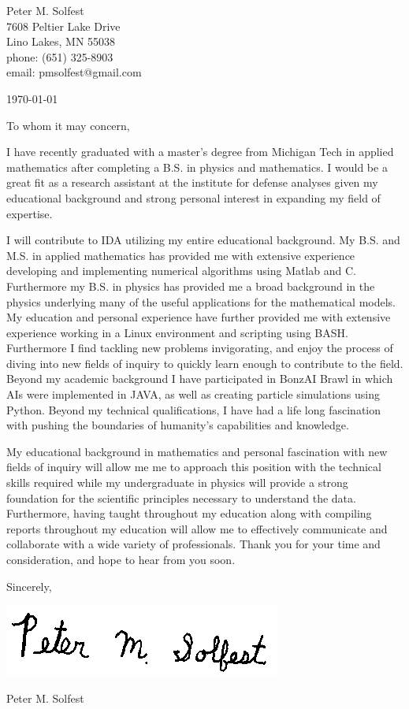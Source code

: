 \documentclass[letterpaper,12pt]{article}
\begin{document}
Peter M. Solfest\\
7608 Peltier Lake Drive\\
Lino Lakes, MN 55038\\
phone: (651) 325-8903\\
email: pmsolfest@gmail.com

\today

To whom it may concern,

I have recently graduated with a master's degree from Michigan Tech in applied mathematics after
completing a B.S. in physics and mathematics.
I would be a great fit as a research assistant
at the institute for defense analyses given my educational background
and strong personal interest in expanding my field of expertise.

I will contribute to IDA utilizing my entire educational background.
My B.S. and M.S. in applied mathematics has provided me with extensive experience developing
and implementing numerical algorithms using Matlab and C.
Furthermore my B.S. in physics has provided me a broad background in the physics
underlying many of the useful applications for the mathematical models.
My education and personal experience have further provided me with
extensive experience working in a Linux environment and scripting
using BASH.
Furthermore I find tackling new problems invigorating, and enjoy
the process of diving into new fields of inquiry to quickly learn
enough to contribute to the field.
Beyond my academic background I have participated in BonzAI Brawl in which
AIs were implemented in JAVA, as well as
creating particle simulations using Python.
%
Beyond my technical qualifications, I have had a life long fascination with
pushing the boundaries of humanity's capabilities and knowledge.

My educational background in mathematics and personal fascination
with new fields of inquiry will allow me
me to approach this position with the technical skills required
while my undergraduate in physics 
will provide a strong foundation for the scientific principles necessary
to understand the data.
Furthermore, having taught throughout my education along with compiling reports
throughout my education will allow me to effectively communicate and
collaborate with a wide variety of professionals.
Thank you for your time and consideration, and hope to hear from you soon.


Sincerely,

\includegraphics[height=.5in]{signature.png}

Peter M. Solfest
\end{document}
